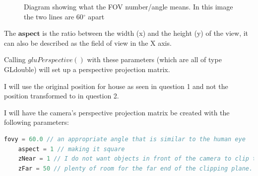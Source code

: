\documentclass[10pt]{report}
\begin{document}
\begin{figure}[H]
    \centering
    \caption{Diagram showing what the FOV number/angle means. In this image the two lines are 60$^{\circ}$ apart}
\end{figure}

The \(\textbf{aspect}\) is the ratio between the width (x) and the height (y) of the view, it can also be described as the field of view in the X axis.

Calling \(gluPerspective()\) with these parameters (which are all of type GLdouble) will set up a perspective projection matrix.

I will use the original position for house as seen in question 1 and not the position transformed to in question 2.

I will have the camera's perspective projection matrix be created with the following parameters: 
\begin{lstlisting}[language = c]
    fovy = 60.0 // an appropriate angle that is similar to the human eye
    aspect = 1 // making it square
    zNear = 1 // I do not want objects in front of the camera to clip to early
    zFar = 50 // plenty of room for the far end of the clipping plane.
\end{lstlisting}
\end{document}
